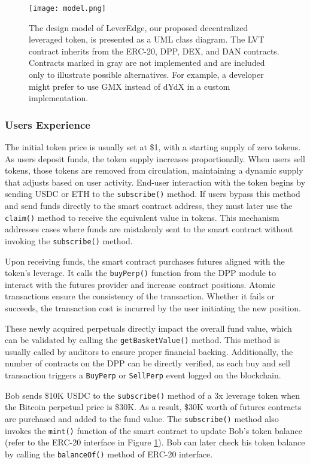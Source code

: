 \begin{figure}[p]
	\centering
	\texttt{[image: model.png]}
	\caption{The design model of LeverEdge, our proposed decentralized leveraged token, is presented as a UML class diagram. The LVT contract inherits from the ERC-20, DPP, DEX, and DAN contracts. Contracts marked in gray are not implemented and are included only to illustrate possible alternatives. For example, a developer might prefer to use GMX instead of dYdX in a custom implementation.}
	\label{fig:model}
\end{figure}

\subsubsection{Users Experience}
The initial token price is usually set at \$1, with a starting supply of zero tokens. As users deposit funds, the token supply increases proportionally. When users sell tokens, those tokens are removed from circulation, maintaining a dynamic supply that adjusts based on user activity. End-user interaction with the token begins by sending USDC or ETH to the \texttt{subscribe()} method. If users bypass this method and send funds directly to the smart contract address, they must later use the \texttt{claim()} method to receive the equivalent value in tokens. This mechanism addresses cases where funds are mistakenly sent to the smart contract without invoking the \texttt{subscribe()} method.

Upon receiving funds, the smart contract purchases futures aligned with the token's leverage. It calls the \texttt{buyPerp()} function from the DPP module to interact with the futures provider and increase contract positions. Atomic transactions ensure the consistency of the transaction. Whether it fails or succeeds, the transaction cost is incurred by the user initiating the new position. 

These newly acquired perpetuals directly impact the overall fund value, which can be validated by calling the \texttt{getBasketValue()} method. This method is usually called by auditors to ensure proper financial backing. Additionally, the number of contracts on the DPP can be directly verified, as each buy and sell transaction triggers a \texttt{BuyPerp} or \texttt{SellPerp} event logged on the blockchain.

\begin{example}\label{ex:experience1}
	Bob sends \$10K USDC to the \texttt{subscribe()} method of a 3x leverage token when the Bitcoin perpetual price is \$30K. As a result, \$30K worth of futures contracts are purchased and added to the fund value. The \texttt{subscribe()} method also invokes the \texttt{mint()} function of the smart contract to update Bob's token balance (refer to the ERC-20 interface in Figure \ref{fig:model}). Bob can later check his token balance by calling the \texttt{balanceOf()} method of ERC-20 interface.
\end{example}

